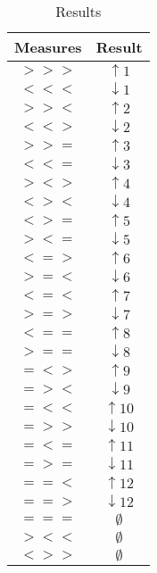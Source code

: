 \documentclass[11pt]{article} %
\begin{document}
\begin{table}[h]
\begin{center}
\begin{tabular}{cc}
\toprule
Measures & Result \\
\midrule
$>>>$ & $\uparrow 1$ \\
$<<<$ & $\downarrow 1$ \\

$>><$ & $\uparrow 2$ \\
$<<>$ & $\downarrow 2$ \\

$>>=$ & $\uparrow 3$ \\
$<<=$ & $\downarrow 3$ \\

$><>$ & $\uparrow 4$ \\
$<><$ & $\downarrow 4$ \\

$<>=$ & $\uparrow 5$ \\
$><=$ & $\downarrow 5$ \\

$<=>$ & $\uparrow 6$ \\
$>=<$ & $\downarrow 6$ \\

$<=<$ & $\uparrow 7$ \\
$>=>$ & $\downarrow 7$ \\

$<==$ & $\uparrow 8$ \\
$>==$ & $\downarrow 8$ \\

$=<>$ & $\uparrow 9$ \\
$=><$ & $\downarrow 9$ \\

$=<<$ & $\uparrow 10$ \\
$=>>$ & $\downarrow 10$ \\

$=<=$ & $\uparrow 11$ \\
$=>=$ & $\downarrow 11$ \\

$==<$ & $\uparrow 12$ \\
$==>$ & $\downarrow 12$ \\

$===$ & $\emptyset$ \\
$><<$ & $\emptyset$ \\
$<>>$ & $\emptyset$ \\

\bottomrule
\end{tabular}
\end{center}
\caption{Results}
\end{table}
\end{document}
